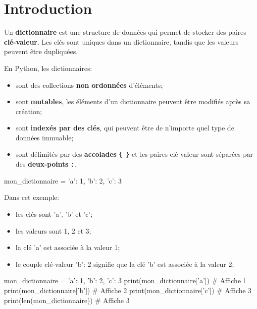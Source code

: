\def\level{Première}  %
\def\course{NSI}
\def\chaptername{Les dictionnaires} %
\def\docname{LP07}        %

\pagestyle{cours_FP}
\makeheader{} %

\section{Introduction}

\begin{definition}{}
	Un \textbf{dictionnaire} est une structure de données qui permet de stocker des paires \textbf{clé-valeur}. Les clés sont uniques dans un dictionnaire, tandis que les valeurs peuvent être dupliquées.

	En Python, les dictionnaires:
	\begin{itemize}
		\item sont des collections \textbf{non ordonnées} d'éléments;
		\item sont \textbf{mutables}, les éléments d'un dictionnaire peuvent être modifiés après sa création;
		\item sont \textbf{indexés par des clés}, qui peuvent être de n'importe quel type de données immuable;
		\item sont délimités par des \textbf{accolades} \verb|{ }| et les paires clé-valeur sont séparées par des \textbf{deux-points} \verb|:|.
	\end{itemize}
	
	\begin{CodePythontexAlt}[Largeur=1\linewidth,Centre,PremLigne=1,Lignes=false,]{}
mon_dictionnaire = {'a': 1, 'b': 2, 'c': 3}
	\end{CodePythontexAlt}

	Dans cet exemple:
	\begin{itemize}
		\item les clés sont 'a', 'b' et 'c';
		\item les valeurs sont 1, 2 et 3;
		\item la clé 'a' est associée à la valeur 1;
		\item le couple clé-valeur 'b': 2 signifie que la clé 'b' est associée à la valeur 2;
	\end{itemize}
	
\end{definition}

\begin{propriete}{}
\begin{CodePythontexAlt}[Largeur=1\linewidth,Centre,PremLigne=1]{}
mon_dictionnaire = {'a': 1, 'b': 2, 'c': 3}
print(mon_dictionnaire['a'])  # Affiche 1
print(mon_dictionnaire['b'])  # Affiche 2
print(mon_dictionnaire['c'])  # Affiche 3
print(len(mon_dictionnaire))  # Affiche 3
		\end{CodePythontexAlt}
\end{propriete}

